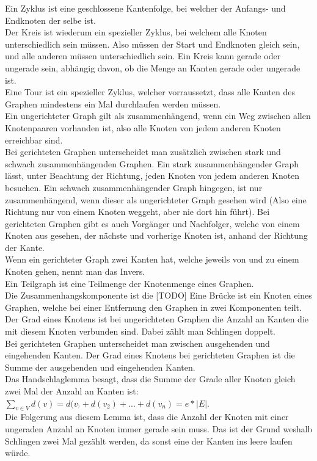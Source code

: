 \documentclass{article}
\begin{document}
	Ein Zyklus ist eine geschlossene Kantenfolge, bei welcher der Anfangs- und Endknoten der selbe ist. \\
	Der Kreis ist wiederum ein spezieller Zyklus, bei welchem alle Knoten unterschiedlich sein müssen. Also müssen der Start und Endknoten gleich sein, und alle anderen müssen unterschiedlich sein. Ein Kreis kann gerade oder ungerade sein, abhängig davon, ob die Menge an Kanten gerade oder ungerade ist. \\
	Eine Tour ist ein spezieller Zyklus, welcher vorraussetzt, dass alle Kanten des Graphen mindestens ein Mal durchlaufen werden müssen. \\
	Ein ungerichteter Graph gilt als zusammenhängend, wenn ein Weg zwischen allen Knotenpaaren vorhanden ist, also alle Knoten von jedem anderen Knoten erreichbar sind. \\
	Bei gerichteten Graphen unterscheidet man zusätzlich zwischen stark und schwach zusammenhängenden Graphen. Ein stark zusammenhängender Graph lässt, unter Beachtung der Richtung, jeden Knoten von jedem anderen Knoten besuchen. Ein schwach zusammenhängender Graph hingegen, ist nur zusammenhängend, wenn dieser als ungerichteter Graph gesehen wird (Also eine Richtung nur von einem Knoten weggeht, aber nie dort hin führt).
	Bei gerichteten Graphen gibt es auch Vorgänger und Nachfolger, welche von einem Knoten aus gesehen, der nächste und vorherige Knoten ist, anhand der Richtung der Kante. \\
	Wenn ein gerichteter Graph zwei Kanten hat, welche jeweils von und zu einem Knoten gehen, nennt man das Invers. \\
	Ein Teilgraph ist eine Teilmenge der Knotenmenge eines Graphen.  \\
	Die Zusammenhangskomponente ist die [TODO]
	Eine Brücke ist ein Knoten eines Graphen, welche bei einer Entfernung den Graphen in zwei Komponenten teilt. \\
	Der Grad eines Knotens ist bei ungerichteten Graphen die Anzahl an Kanten die mit diesem Knoten verbunden sind. Dabei zählt man Schlingen doppelt. \\
	Bei gerichteten Graphen unterscheidet man zwischen ausgehenden und eingehenden Kanten. Der Grad eines Knotens bei gerichteten Graphen ist die Summe der ausgehenden und eingehenden Kanten. \\
	Das Handschlaglemma besagt, dass die Summe der Grade aller Knoten gleich zwei Mal der Anzahl an Kanten ist: $\sum_{v\in V}d(v)=d(v_^)+d(v_2)+...+d(v_n)=e*|E|$. \\
	Die Folgerung aus diesem Lemma ist, dass die Anzahl der Knoten mit einer ungeraden Anzahl an Knoten immer gerade sein muss. Das ist der Grund weshalb Schlingen zwei Mal gezählt werden, da sonst eine der Kanten ins leere laufen würde. 
\end{document}
